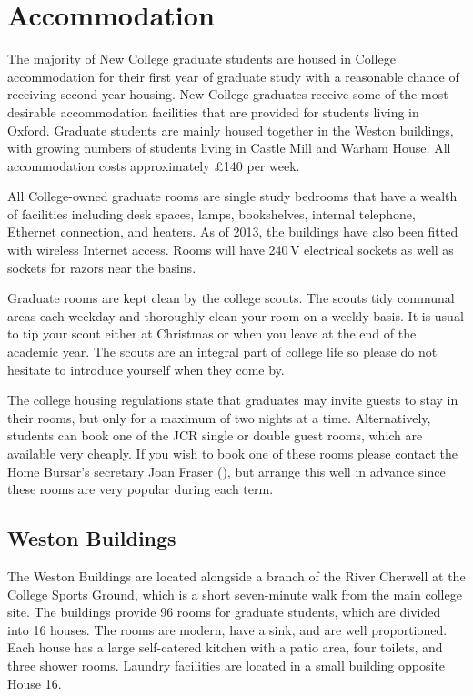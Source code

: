 
\chapter{Accommodation}

The majority of New College graduate students are housed in College accommodation for their first year of graduate study with a reasonable chance of receiving second year housing. New College graduates receive some of the most desirable accommodation facilities that are provided for students living in Oxford. Graduate students are mainly housed together in the Weston buildings, with growing numbers of students living in Castle Mill and Warham House. All accommodation costs approximately \pounds140 per week.

All College-owned graduate rooms are single study bedrooms that have a wealth of facilities including desk spaces, lamps, bookshelves, internal telephone, Ethernet connection, and heaters. As of 2013, the buildings have also been fitted with wireless Internet access.  Rooms will have 240\,V electrical sockets as well as sockets for razors near the basins.

Graduate rooms are kept clean by the college scouts. The scouts tidy communal areas each weekday and thoroughly clean your room on a weekly basis. It is usual to tip your scout either at Christmas or when you leave at the end of the academic year. The scouts are an integral part of college life so please do not hesitate to introduce yourself when they come by. 

The college housing regulations state that graduates may invite guests to stay in their rooms, but only for a maximum of two nights at a time. Alternatively, students can book one of the JCR single or double guest rooms, which are available very cheaply. If you wish to book one of these rooms please contact the Home Bursar's secretary Joan Fraser (\href{mailto:joan.fraser@new.ox.ac.uk}{}), but arrange this well in advance since these rooms are very popular during each term.

\section{Weston Buildings}

The Weston Buildings are located alongside a branch of the River Cherwell at the 
College Sports Ground, which is a short seven-minute walk from the main college site. The buildings provide 96 rooms for graduate students, which are divided into 16 houses. The rooms are modern, have a sink, and are well proportioned. Each house has a large self-catered kitchen with a patio area, four toilets, and three shower rooms. Laundry facilities are located in a small building opposite House 16.

